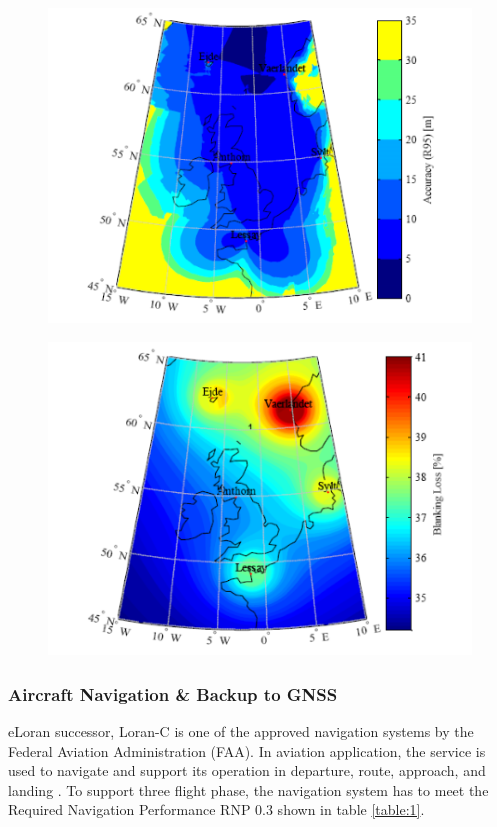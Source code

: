 \begin{figure}[!ht]
\centering
\begin{minipage}{.45\textwidth}
  \centering
  \includegraphics[height=0.6\linewidth]{Figures/ELORAN_maritime_contour_UK.PNG}
  \label{fig:elorancontour}
\end{minipage}%
\begin{minipage}{.45\textwidth}
  \centering
  \includegraphics[height=0.7\linewidth]{Figures/ELORAN_blanking_percentage.PNG}
  \label{fig:eloranblanked}
\end{minipage}
\end{figure}

\subsubsection{Aircraft Navigation \& Backup to GNSS}
eLoran successor, Loran-C is one of the approved navigation systems by the Federal Aviation Administration (FAA). In aviation application, the service is used to navigate and support its operation in departure, route, approach, and landing \cite{InternationalLORANAssociation2007EnhancedApril}\cite{BartoneH-fieldApplications}. To support three flight phase, the navigation system has to meet the Required Navigation Performance RNP 0.3 shown in table \ref{table:1}.\\


